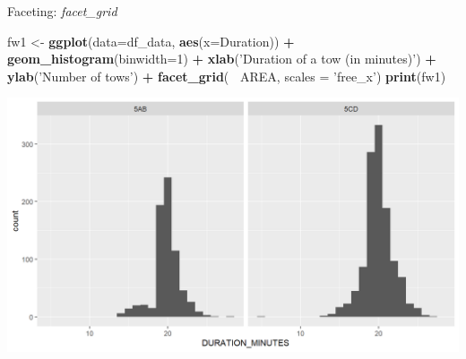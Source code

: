 \documentclass[
  ignorenonframetext,
]{beamer}
\newenvironment{Shaded}{\begin{snugshade}}{\end{snugshade}}
\newcommand{\DataTypeTok}[1]{\textcolor[rgb]{0.13,0.29,0.53}{#1}}
\newcommand{\DecValTok}[1]{\textcolor[rgb]{0.00,0.00,0.81}{#1}}
\newcommand{\KeywordTok}[1]{\textcolor[rgb]{0.13,0.29,0.53}{\textbf{#1}}}
\newcommand{\NormalTok}[1]{#1}
\newcommand{\OperatorTok}[1]{\textcolor[rgb]{0.81,0.36,0.00}{\textbf{#1}}}
\newcommand{\StringTok}[1]{\textcolor[rgb]{0.31,0.60,0.02}{#1}}
\begin{document}
\begin{frame}[fragile]{Faceting: \emph{facet\_grid}}
\protect\hypertarget{faceting-facet_grid-2}{}

\begin{Shaded}
\begin{Highlighting}[]
\NormalTok{fw1 <-}\StringTok{ }\KeywordTok{ggplot}\NormalTok{(}\DataTypeTok{data=}\NormalTok{df_data, }\KeywordTok{aes}\NormalTok{(}\DataTypeTok{x=}\NormalTok{Duration)) }\OperatorTok{+}
\StringTok{  }\KeywordTok{geom_histogram}\NormalTok{(}\DataTypeTok{binwidth=}\DecValTok{1}\NormalTok{) }\OperatorTok{+}
\StringTok{  }\KeywordTok{xlab}\NormalTok{(}\StringTok{'Duration of a tow (in minutes)'}\NormalTok{) }\OperatorTok{+}\StringTok{ }\KeywordTok{ylab}\NormalTok{(}\StringTok{'Number of tows'}\NormalTok{) }\OperatorTok{+}
\StringTok{  }\KeywordTok{facet_grid}\NormalTok{(}\OperatorTok{~}\StringTok{ }\NormalTok{AREA, }\DataTypeTok{scales =} \StringTok{'free_x'}\NormalTok{)}
\KeywordTok{print}\NormalTok{(fw1)}
\end{Highlighting}
\end{Shaded}

\begin{center}\includegraphics[width=0.8\linewidth]{figure/facet_wrap_1-1} \end{center}

\end{frame}
\end{document}
